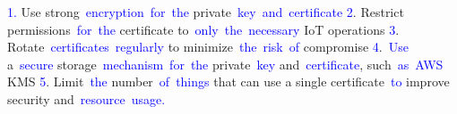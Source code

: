 \documentclass{article}
\begin{document}
\begin{tcolorbox}[colframe=black,colback=white]
{}\textcolor{blue}{1}\textcolor{blue}{.} Use strong\textcolor{blue}{~encryption}\textcolor{blue}{~for}\textcolor{blue}{~the} private\textcolor{blue}{~key}\textcolor{blue}{~and}\textcolor{blue}{~certificate}
\textcolor{blue}{2}. Restrict permissions\textcolor{blue}{~for}\textcolor{blue}{~the} certificate to\textcolor{blue}{~only}\textcolor{blue}{~the}\textcolor{blue}{~necessary} IoT operations\textcolor{blue}{
}\textcolor{blue}{3}. Rotate\textcolor{blue}{~certificates}\textcolor{blue}{~regularly} to minimize\textcolor{blue}{~the}\textcolor{blue}{~risk}\textcolor{blue}{~of} compromise\textcolor{blue}{
}\textcolor{blue}{4}.\textcolor{blue}{~Use} a\textcolor{blue}{~secure} storage\textcolor{blue}{~mechanism}\textcolor{blue}{~for}\textcolor{blue}{~the} private\textcolor{blue}{~key} and\textcolor{blue}{~certificate}, such\textcolor{blue}{~as}\textcolor{blue}{~AWS} KMS\textcolor{blue}{
}\textcolor{blue}{5}. Limit\textcolor{blue}{~the} number\textcolor{blue}{~of}\textcolor{blue}{~things} that can use a single certificate\textcolor{blue}{~to} improve security and\textcolor{blue}{~resource}\textcolor{blue}{~usage}\textcolor{blue}{.}
\end{tcolorbox}
\end{document}
